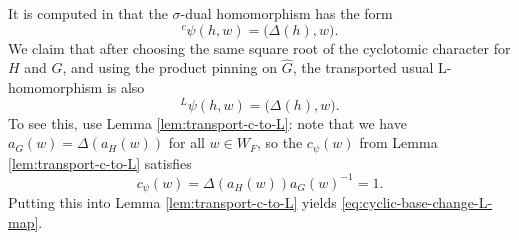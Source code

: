 \documentclass[reqno]{amsart}
\numberwithin{equation}{subsection}
\newcommand{\wh}[1]{\widehat{#1}}
\newcommand{\co}{\colon}
\newcommand{\ld}{{}^L}
\newcommand{\lc}{{}^c}
\newcommand{\inj}{\hookrightarrow}
\DeclareMathOperator{\Div}{Div}
\DeclareMathOperator{\Gr}{Gr}
\newcommand{\rH}{\ensuremath{\mathrm{H}}\xspace}
\newcommand{\bT}{\mathbf{T}}
\newcommand{\bW}{\mathbf{W}}
\theoremstyle{remark}
\numberwithin{equation}{subsection}
\numberwithin{figure}{subsection}
\begin{document}
It is computed in \cite[Proposition 5.8.2]{F24} that the $\sigma$-dual homomorphism has the form
\begin{equation}\label{eq:cyclic-base-change-c-map}
\lc\psi(h,w)=\bigl(\Delta(h),w\bigr).
\end{equation}
We claim that after choosing the same square root of the cyclotomic character for $H$ and
$G$, and using the product pinning on $\wh G$, the transported usual
L-homomorphism is also
\begin{equation}\label{eq:cyclic-base-change-L-map}
\ld\psi(h,w)=\bigl(\Delta(h),w\bigr).
\end{equation}
To see this, use Lemma \ref{lem:transport-c-to-L}: note that we have $a_G(w)=\Delta(a_H(w))$ for all $w \in W_F$,
so the $c_\psi(w)$ from Lemma \ref{lem:transport-c-to-L} satisfies
\[
c_\psi(w)=\Delta(a_H(w))a_G(w)^{-1}=1.
\]
Putting this into Lemma \ref{lem:transport-c-to-L} yields \eqref{eq:cyclic-base-change-L-map}.



\end{document}

